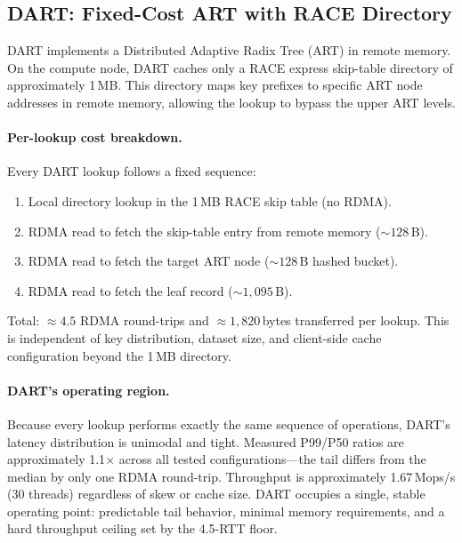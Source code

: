 \documentclass[sigconf, nonacm]{acmart}
\begin{document}
\subsection{DART: Fixed-Cost ART with RACE Directory}

DART implements a Distributed Adaptive Radix Tree (ART) in remote memory. On the compute node, DART caches only a RACE express skip-table directory of approximately 1\,MB. This directory maps key prefixes to specific ART node addresses in remote memory, allowing the lookup to bypass the upper ART levels.

\paragraph{Per-lookup cost breakdown.}
Every DART lookup follows a fixed sequence:
\begin{enumerate}
  \item Local directory lookup in the 1\,MB RACE skip table (no RDMA).
  \item RDMA read to fetch the skip-table entry from remote memory (${\sim}128$\,B).
  \item RDMA read to fetch the target ART node (${\sim}128$\,B hashed bucket).
  \item RDMA read to fetch the leaf record (${\sim}1{,}095$\,B).
\end{enumerate}
Total: ${\approx}4.5$ RDMA round-trips and ${\approx}1{,}820$\,bytes transferred per lookup. This is independent of key distribution, dataset size, and client-side cache configuration beyond the 1\,MB directory.

\paragraph{DART's operating region.}
Because every lookup performs exactly the same sequence of operations, DART's latency distribution is unimodal and tight. Measured P99/P50 ratios are approximately 1.1$\times$ across all tested configurations---the tail differs from the median by only one RDMA round-trip. Throughput is approximately 1.67\,Mops/s (30 threads) regardless of skew or cache size. DART occupies a single, stable operating point: predictable tail behavior, minimal memory requirements, and a hard throughput ceiling set by the 4.5-RTT floor.
\end{document}

